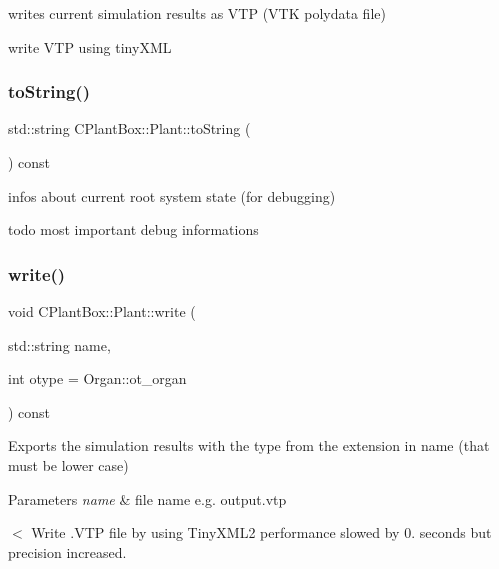 writes current simulation results as V\+TP (V\+TK polydata file) 

write V\+TP using tiny\+X\+ML \mbox{\label{classCPlantBox_1_1Plant_ae4ec37df107dc7f669bfb1c067e11204}} 
\subsubsection{\texorpdfstring{to\+String()}{toString()}}
{\footnotesize\ttfamily std\+::string C\+Plant\+Box\+::\+Plant\+::to\+String (\begin{DoxyParamCaption}{ }\end{DoxyParamCaption}) const}



infos about current root system state (for debugging) 

todo most important debug informations \mbox{\label{classCPlantBox_1_1Plant_af55cdb6c0bfd640c614e0ca80274f58e}} 
\subsubsection{\texorpdfstring{write()}{write()}}
{\footnotesize\ttfamily void C\+Plant\+Box\+::\+Plant\+::write (\begin{DoxyParamCaption}\item[{std\+::string}]{name,  }\item[{int}]{otype = {\ttfamily Organ\+:\+:ot\+\_\+organ} }\end{DoxyParamCaption}) const}

Exports the simulation results with the type from the extension in name (that must be lower case)


\begin{DoxyParams}{Parameters}
{\em name} & file name e.\+g. output.\+vtp \\
\hline
\end{DoxyParams}
$<$ Write .V\+TP file by using Tiny\+X\+M\+L2 performance slowed by 0. seconds but precision increased. \mbox{\label{classCPlantBox_1_1Plant_ae9037860524689c4475b7eb7f9ffc56e}} 
